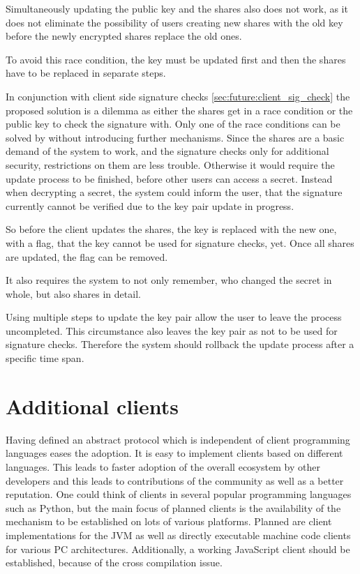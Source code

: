 Simultaneously updating the public key and the shares also does not work, as it
does not eliminate the possibility of users creating new shares with the old key
before the newly encrypted shares replace the old ones.

To avoid this race condition, the key must be updated first and then the shares
have to be replaced in separate steps.

In conjunction with client side signature checks
\ref{sec:future:client_sig_check} the proposed solution is a dilemma as either
the shares get in a race condition or the public key to check the signature
with. Only one of the race conditions can be solved by without introducing
further mechanisms. Since the shares are a basic demand of the system to work,
and the signature checks only for additional security, restrictions on them are
less trouble. Otherwise it would require the update process to be finished,
before other users can access a secret. Instead when decrypting a secret, the
system could inform the user, that the signature currently cannot be verified
due to the key pair update in progress.

So before the client updates the shares, the key is replaced with the new one,
with a flag, that the key cannot be used for signature checks, yet. Once all
shares are updated, the flag can be removed.

It also requires the system to not only remember, who changed the secret in
whole, but also shares in detail.

Using multiple steps to update the key pair allow the user to leave the process
uncompleted. This circumstance also leaves the key pair as not to be used for
signature checks. Therefore the system should rollback the update process after
a specific time span.

\section{Additional clients}

Having defined an abstract protocol which is independent of client programming
languages eases the adoption.  It is easy to implement clients based on
different languages. This leads to faster adoption of the overall ecosystem by
other developers and this leads to contributions of the community as well as a
better reputation. One could think of clients in several popular programming
languages such as Python, but the main focus of planned clients is the
availability of the mechanism to be established on lots of various platforms.
Planned are client implementations for the JVM as well as directly executable
machine code clients for various PC architectures. Additionally, a working
JavaScript client should be established, because of the cross compilation issue.

